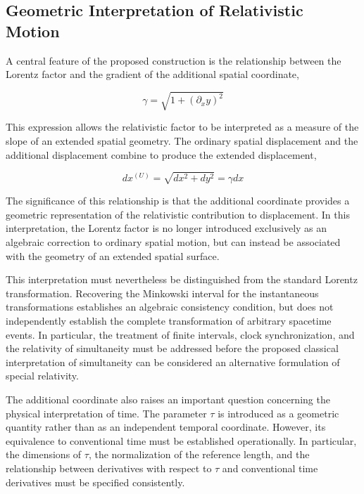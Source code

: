 \documentclass[pdflatex,sn-mathphys-num]{sn-jnl}%
\theoremstyle{thmstyleone}%
\theoremstyle{thmstyletwo}%
\theoremstyle{thmstylethree}%
\begin{document}
\subsection{Geometric Interpretation of Relativistic Motion}

A central feature of the proposed construction is the relationship between the Lorentz factor and the gradient of the additional spatial coordinate,

\begin{equation}
    \gamma
    =
    \sqrt{1+\left(\partial_x y\right)^2}
\end{equation}

This expression allows the relativistic factor to be interpreted as a measure of the slope of an extended spatial geometry. The ordinary spatial displacement and the additional displacement combine to produce the extended displacement,

\begin{equation}
    dx^{(U)}
    =
    \sqrt{dx^2+dy^2}
    =
    \gamma dx
\end{equation}

The significance of this relationship is that the additional coordinate provides a geometric representation of the relativistic contribution to displacement. In this interpretation, the Lorentz factor is no longer introduced exclusively as an algebraic correction to ordinary spatial motion, but can instead be associated with the geometry of an extended spatial surface.

This interpretation must nevertheless be distinguished from the standard Lorentz transformation. Recovering the Minkowski interval for the instantaneous transformations establishes an algebraic consistency condition, but does not independently establish the complete transformation of arbitrary spacetime events. In particular, the treatment of finite intervals, clock synchronization, and the relativity of simultaneity must be addressed before the proposed classical interpretation of simultaneity can be considered an alternative formulation of special relativity.

The additional coordinate also raises an important question concerning the physical interpretation of time. The parameter $\tau$ is introduced as a geometric quantity rather than as an independent temporal coordinate. However, its equivalence to conventional time must be established operationally. In particular, the dimensions of $\tau$, the normalization of the reference length, and the relationship between derivatives with respect to $\tau$ and conventional time derivatives must be specified consistently.
\end{document}
